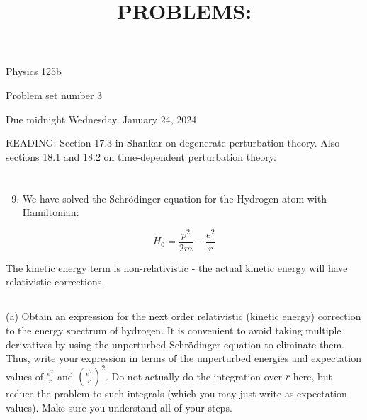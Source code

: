 \documentclass[12pt]{article}
\title{PROBLEMS: }
\author{}
\date{}
\begin{document}
\maketitle
Physics 125b

Problem set number 3

Due midnight Wednesday, January 24, 2024

READING: Section 17.3 in Shankar on degenerate perturbation theory. Also sections 18.1 and 18.2 on time-dependent perturbation theory.
\section{}
\begin{enumerate}
  \setcounter{enumi}{8}
  \item We have solved the Schrödinger equation for the Hydrogen atom with Hamiltonian:
\end{enumerate}

$$
H_{0}=\frac{p^{2}}{2 m}-\frac{e^{2}}{r}
$$

The kinetic energy term is non-relativistic - the actual kinetic energy will have relativistic corrections.
\subsection{}
(a) Obtain an expression for the next order relativistic (kinetic energy) correction to the energy spectrum of hydrogen. It is convenient to avoid taking multiple derivatives by using the unperturbed Schrödinger equation to eliminate them. Thus, write your expression in terms of the unperturbed energies and expectation values of $\frac{e^{2}}{r}$ and $\left(\frac{e^{2}}{r}\right)^{2}$. Do not actually do the integration over $r$ here, but reduce the problem to such integrals (which you may just write as expectation values). Make sure you understand all of your steps.
\end{document}
